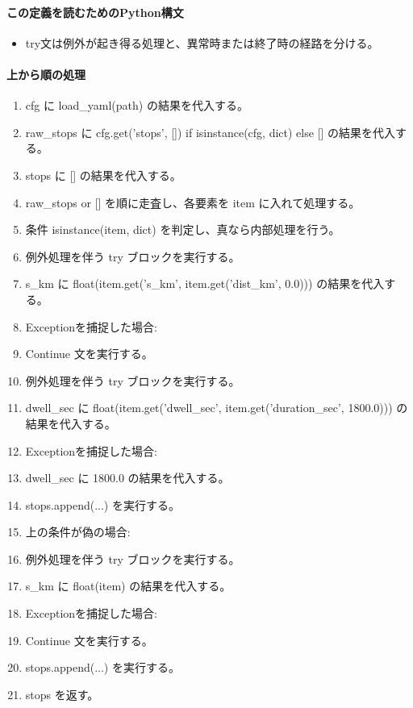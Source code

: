 \documentclass[a4paper,11pt]{article}
\begin{document}
            \paragraph{この定義を読むためのPython構文}
            \begin{itemize}[leftmargin=1.6em]
            \item try文は例外が起き得る処理と、異常時または終了時の経路を分ける。
            \end{itemize}
            \paragraph{上から順の処理}
            \begin{enumerate}[leftmargin=1.8em]
            \item cfg に load\_yaml(path) の結果を代入する。
\item raw\_stops に cfg.get('stops', []) if isinstance(cfg, dict) else [] の結果を代入する。
\item stops に [] の結果を代入する。
\item raw\_stops or [] を順に走査し、各要素を item に入れて処理する。
\item   条件 isinstance(item, dict) を判定し、真なら内部処理を行う。
\item     例外処理を伴う try ブロックを実行する。
\item       s\_km に float(item.get('s\_km', item.get('dist\_km', 0.0))) の結果を代入する。
\item       Exceptionを捕捉した場合:
\item       Continue 文を実行する。
\item     例外処理を伴う try ブロックを実行する。
\item       dwell\_sec に float(item.get('dwell\_sec', item.get('duration\_sec', 1800.0))) の結果を代入する。
\item       Exceptionを捕捉した場合:
\item       dwell\_sec に 1800.0 の結果を代入する。
\item     stops.append(...) を実行する。
\item     上の条件が偽の場合:
\item     例外処理を伴う try ブロックを実行する。
\item       s\_km に float(item) の結果を代入する。
\item       Exceptionを捕捉した場合:
\item       Continue 文を実行する。
\item     stops.append(...) を実行する。
\item stops を返す。
            \end{enumerate}
\end{document}
